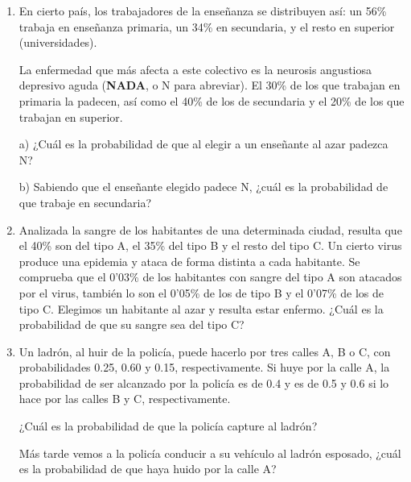 \begin{adjustwidth}{5mm}{5mm}
\begin{enumerate}[PB. 1. ]
\hspace{-1cm}\vspace{1cm}

\item En cierto país, los trabajadores de la enseñanza se distribuyen así: un 56\% trabaja en enseñanza primaria, un 34\% en secundaria, y el resto en superior (universidades).

La enfermedad que más afecta a este colectivo es la neurosis angustiosa depresivo aguda (\textbf{NADA}, o N para abreviar). El 30\% de los que trabajan en primaria la padecen, así como el 40\% de los de secundaria y el 20\% de los que trabajan en superior. 

a) ¿Cuál es la probabilidad de que al elegir a un enseñante al azar padezca N?

b) Sabiendo que el enseñante elegido padece N, ¿cuál es la probabilidad de que trabaje en secundaria? 

\hspace{-1cm}\vspace{1cm}

\item Analizada la sangre de los habitantes de una determinada ciudad, resulta que el 40\% son del tipo A, el 35\% del tipo B y el resto del tipo C. Un cierto virus produce una epidemia y ataca de forma distinta a cada habitante. Se comprueba que el 0’03\% de los habitantes con sangre del tipo A son atacados por el virus, también lo son el 0’05\% de los de tipo B y el 0’07\% de los de tipo C. Elegimos un habitante al azar y resulta estar enfermo. ¿Cuál es la probabilidad de que su sangre sea del tipo C? 

\hspace{-1cm}\vspace{1cm}

\item Un ladrón, al huir de la policía, puede hacerlo por tres calles A, B o C, con probabilidades 0.25, 0.60 y 0.15, respectivamente. Si huye por la calle A, la probabilidad de ser alcanzado por la policía es de 0.4 y es de 0.5 y 0.6 si lo hace por las calles B y C, respectivamente.

¿Cuál es la probabilidad de que la policía capture al ladrón?

Más tarde vemos a la policía conducir a su vehículo al ladrón esposado, ¿cuál es la probabilidad de que haya huido por la calle A?


\end{enumerate}
\end{adjustwidth}
